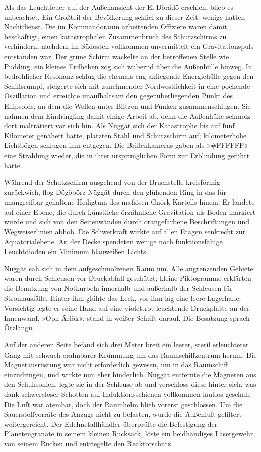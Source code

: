 Als das Leuchtfeuer auf der Außenansicht der El Dörädö erschien, blieb es unbeachtet. Ein Großteil der Bevölkerung schlief zu dieser Zeit; wenige hatten Nachtdienst. Die im Kommandoraum arbeitenden Offiziere waren damit beschäftigt, einen katastrophalen Zusammenbruch des Schutzschirms zu verhindern, nachdem im Südosten vollkommen unvermittelt ein Gravitationspuls entstanden war. Der grüne Schirm wackelte an der betroffenen Stelle wie Pudding; ein kleines Erdbeben zog sich wabernd über die Außenhülle hinweg. In bedrohlicher Resonanz schlug die ehemals eng anliegende Energiehülle gegen den Schiffsrumpf, steigerte sich mit zunehmender Nordwestlichkeit in eine pochende Oszillation und erreichte unaufhaltsam den gegenüberliegenden Punkt des Ellipsoids, an dem die Wellen unter Blitzen und Funken zusammenschlugen. Sie nahmen dem Eindringling damit einige Arbeit ab, denn die Außenhülle schmolz dort malträtiert vor sich hin. Als Nüggät sich der Katastrophe bis auf fünf Kilometer genähert hatte, platzten Stahl und Schutzschirm auf; kilometerhohe Lichtbögen schlugen ihm entgegen. Die Brillenkameras gaben als »#FFFFFF« eine Strahlung wieder, die in ihrer ursprünglichen Form zur Erblindung geführt hätte.

Während der Schutzschirm ausgehend von der Bruchstelle kreisförmig zurückwich, flog Dögöbörz Nüggät durch den glühenden Ring in das für unangreifbar gehaltene Heiligtum des mafiösen Gnörk-Kartells hinein. Er landete auf einer Ebene, die durch künstliche örzähnliche Gravitation als Boden markiert wurde und sich von den Seitenwänden durch orangefarbene Beschriftungen und Wegweiserlinien abhob. Die Schwerkraft wirkte auf allen Etagen senkrecht zur Äquatorialebene. An der Decke spendeten wenige noch funktionsfähige Leuchtdioden ein Minimum blauweißen Lichts.

Nüggät sah sich in dem aufgeschmolzenen Raum um. Alle angrenzenden Gebiete waren durch Schleusen vor Druckabfall geschützt; kleine Piktogramme erklärten die Benutzung von Notkurbeln innerhalb und außerhalb der Schleusen für Stromausfälle. Hinter ihm glühte das Leck, vor ihm lag eine leere Lagerhalle. Vorsichtig legte er seine Hand auf eine violettrot leuchtende Druckplatte an der Innenwand. »Öpn Ärlök«, stand in weißer Schrift darauf. Die Besatzung sprach Örzlängü.

Auf der anderen Seite befand sich drei Meter breit ein leerer, steril erleuchteter Gang mit schwach erahnbarer Krümmung um das Raumschiffzentrum herum. Die Magnetausrüstung war nicht erforderlich gewesen, um in das Raumschiff einzudringen, und wirkte nun eher hinderlich. Nüggät entfernte die Magneten aus den Schuhsohlen, legte sie in der Schleuse ab und verschloss diese hinter sich, was dank schwereloser Schotten auf Induktionsschienen vollkommen lautlos geschah. Die Luft war atembar, doch der Raumhelm blieb vorerst geschlossen. Um die Sauerstoffvorräte des Anzugs nicht zu belasten, wurde die Außenluft gefiltert weitergereicht. Der Edelmetallhändler überprüfte die Befestigung der Planetengranate in seinem kleinen Rucksack, löste ein beidhändiges Lasergewehr von seinem Rücken und entriegelte den Reaktorschutz.

